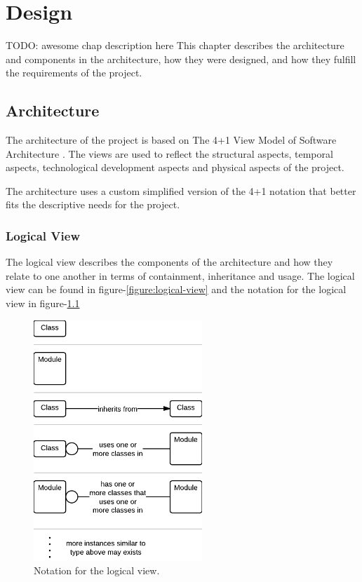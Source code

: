 
\chapter{Design}

\minitoc
TODO: awesome chap description here
This chapter describes the architecture and components in the architecture, how they were designed, and how they fulfill the requirements of the project.


\clearpage

\section{Architecture}
The architecture of the project is based on The 4+1 View Model of Software Architecture \cite{Kruchten}. The views are used to reflect the structural aspects, temporal aspects, technological development aspects and physical aspects of the project.

The architecture uses a custom simplified version of the 4+1 notation that better fits the descriptive needs for the project.


\subsection{Logical View}
The logical view describes the components of the architecture and how they relate to one another in terms of containment, inheritance and usage. The logical view can be found in figure-\ref{figure:logical-view} and the notation for the logical view in figure-\ref{figure:logical-view-notation}

\begin{figure}[H]
\centerline{\includegraphics[width=2.5in]{image/architecture-logical-view-notation.png}}
\caption[Notation for the logical view]{Notation for the logical view.}
\label{figure:logical-view-notation}
\end{figure}

